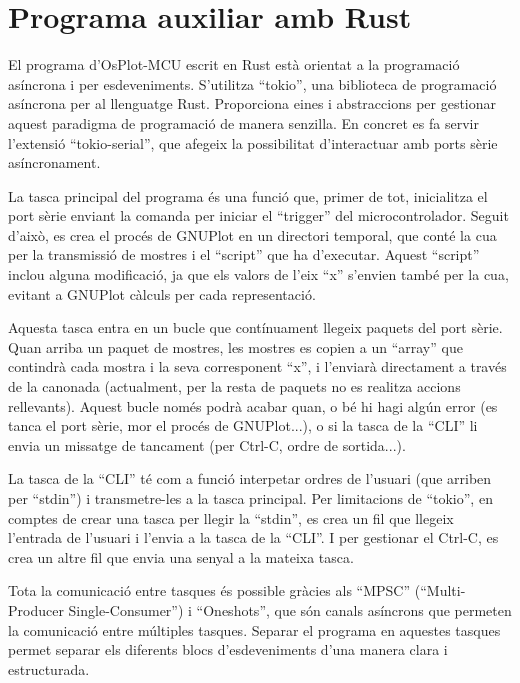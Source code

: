 \documentclass{tfgitic}[2023/06/30]
\begin{document}
\section{Programa auxiliar amb Rust}

El programa d'OsPlot-MCU escrit en Rust està orientat a la programació
asíncrona i per esdeveniments. S'utilitza ``tokio'', una biblioteca
de programació asíncrona per al llenguatge Rust. Proporciona eines
i abstraccions per gestionar aquest paradigma de programació de
manera senzilla. En concret es fa servir l'extensió ``tokio-serial'',
que afegeix la possibilitat d'interactuar amb ports sèrie
asíncronament.

\newpage

La tasca principal del programa és una funció que, primer de tot,
inicialitza el port sèrie enviant la comanda per iniciar el
``trigger'' del microcontrolador. Seguit d'això, es crea el procés de
GNUPlot en un directori temporal, que conté la cua per la transmissió
de mostres i el ``script'' que ha d'executar. Aquest ``script''
inclou alguna modificació, ja que els valors de l'eix ``x'' s'envien
també per la cua, evitant a GNUPlot càlculs per cada representació.

Aquesta tasca entra en un bucle que contínuament llegeix paquets del
port sèrie. Quan arriba un paquet de mostres, les mostres es copien a
un ``array'' que contindrà cada mostra i la seva corresponent ``x'', i
l'enviarà directament a través de la canonada (actualment, per la
resta de paquets no es realitza accions rellevants). Aquest bucle
només podrà acabar quan, o bé hi hagi algún error (es tanca el port
sèrie, mor el procés de GNUPlot...), o si la tasca de la ``CLI'' li
envia un missatge de tancament (per Ctrl-C, ordre de sortida...).

La tasca de la ``CLI'' té com a funció interpetar ordres de l'usuari
(que arriben per ``stdin'') i transmetre-les a la tasca principal.
Per limitacions de ``tokio'', en comptes de crear una tasca per llegir
la ``stdin'', es crea un fil que llegeix l'entrada de l'usuari i
l'envia a la tasca de la ``CLI''. I per gestionar el Ctrl-C, es crea
un altre fil que envia una senyal a la mateixa tasca.

Tota la comunicació entre tasques és possible gràcies als ``MPSC''
(``Multi-Producer Single-Consumer'') i ``Oneshots'', que són canals
asíncrons que permeten la comunicació entre múltiples tasques. Separar
el programa en aquestes tasques permet separar els diferents blocs
d'esdeveniments d'una manera clara i estructurada.
\end{document}
